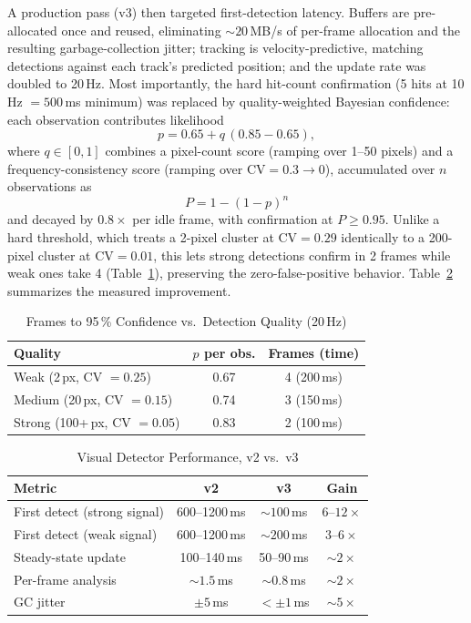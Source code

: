 \documentclass[conference]{IEEEtran}
\begin{document}
A production pass (v3) then targeted first-detection latency. Buffers
are pre-allocated once and reused, eliminating ${\sim}20$\,MB/s of
per-frame allocation and the resulting garbage-collection jitter;
tracking is velocity-predictive, matching detections against each
track's predicted position; and the update rate was doubled to 20\,Hz.
Most importantly, the hard hit-count confirmation (5 hits at 10\,Hz
$= 500$\,ms minimum) was replaced by quality-weighted Bayesian
confidence: each observation contributes likelihood
\begin{equation}
p = 0.65 + q\,(0.85 - 0.65),
\label{eq:quality}
\end{equation}
where $q \in [0,1]$ combines a pixel-count score (ramping over 1--50
pixels) and a frequency-consistency score (ramping over
$\mathrm{CV} = 0.3 \to 0$), accumulated over $n$ observations as
\begin{equation}
P = 1 - (1 - p)^n
\label{eq:accum}
\end{equation}
and decayed by $0.8\times$ per idle frame, with confirmation at
$P \ge 0.95$. Unlike a hard threshold, which treats a 2-pixel cluster at
$\mathrm{CV}=0.29$ identically to a 200-pixel cluster at
$\mathrm{CV}=0.01$, this lets strong detections confirm in 2 frames
while weak ones take 4 (Table~\ref{tab:quality}), preserving the
zero-false-positive behavior. Table~\ref{tab:latencyres} summarizes the
measured improvement.

\begin{table}[t]
\caption{Frames to 95\,\% Confidence vs.\ Detection Quality (20\,Hz)}
\label{tab:quality}
\centering
\begin{tabular}{@{}lcc@{}}
\toprule
\textbf{Quality} & $p$ \textbf{per obs.} & \textbf{Frames (time)} \\
\midrule
Weak (2\,px, CV $=0.25$) & 0.67 & 4 (200\,ms) \\
Medium (20\,px, CV $=0.15$) & 0.74 & 3 (150\,ms) \\
Strong (100+\,px, CV $=0.05$) & 0.83 & 2 (100\,ms) \\
\bottomrule
\end{tabular}
\end{table}

\begin{table}[t]
\caption{Visual Detector Performance, v2 vs.\ v3}
\label{tab:latencyres}
\centering
\begin{tabular}{@{}lccc@{}}
\toprule
\textbf{Metric} & \textbf{v2} & \textbf{v3} & \textbf{Gain} \\
\midrule
First detect (strong signal) & 600--1200\,ms & ${\sim}100$\,ms & $6$--$12\times$ \\
First detect (weak signal) & 600--1200\,ms & ${\sim}200$\,ms & $3$--$6\times$ \\
Steady-state update & 100--140\,ms & 50--90\,ms & ${\sim}2\times$ \\
Per-frame analysis & ${\sim}1.5$\,ms & ${\sim}0.8$\,ms & ${\sim}2\times$ \\
GC jitter & $\pm 5$\,ms & $<\pm 1$\,ms & ${\sim}5\times$ \\
\bottomrule
\end{tabular}
\end{table}
\end{document}
